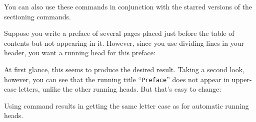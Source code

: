   You can also use these commands in conjunction with the starred versions of 
  the sectioning commands.%
    \begin{Example}
      Suppose you write a preface of several pages placed just before the 
      table of contents but not appearing in it. However, since you use 
      dividing lines in your header, you want a running head for this preface:
      At first glance, this seems to produce the desired result. Taking a
      second look, however, you can see that the running title 
      ``\texttt{Preface}'' does not appear in upper-case letters, unlike the 
      other running heads. But that's easy to change:
      Using command  results in getting
      the same letter case as for automatic running heads.


\end{Example}
